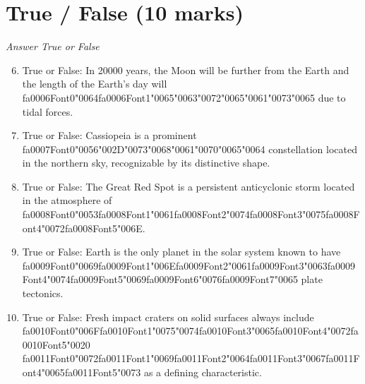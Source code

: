 \documentclass[12pt]{article}
\begin{document}
\section*{True / False (10 marks)}
\textit{Answer True or False}
\begin{enumerate}[label=\arabic*.]
\setcounter{enumi}{5}
\item True or False: In 20000 years, the Moon will be further from the Earth and the length of the Earth's day will {\csname fa0006Font0\endcsname\char"0064}{\csname fa0006Font1\endcsname\char"0065}{\char"0063}{\char"0072}{\char"0065}{\char"0061}{\char"0073}{\char"0065} due to tidal forces.
\item True or False: Cassiopeia is a prominent {\csname fa0007Font0\endcsname\char"0056}{\char"002D}{\char"0073}{\char"0068}{\char"0061}{\char"0070}{\char"0065}{\char"0064} constellation located in the northern sky, recognizable by its distinctive shape.
\item True or False: The Great Red Spot is a persistent anticyclonic storm located in the atmosphere of {\csname fa0008Font0\endcsname\char"0053}{\csname fa0008Font1\endcsname\char"0061}{\csname fa0008Font2\endcsname\char"0074}{\csname fa0008Font3\endcsname\char"0075}{\csname fa0008Font4\endcsname\char"0072}{\csname fa0008Font5\endcsname\char"006E}.
\item True or False: Earth is the only planet in the solar system known to have {\csname fa0009Font0\endcsname\char"0069}{\csname fa0009Font1\endcsname\char"006E}{\csname fa0009Font2\endcsname\char"0061}{\csname fa0009Font3\endcsname\char"0063}{\csname fa0009Font4\endcsname\char"0074}{\csname fa0009Font5\endcsname\char"0069}{\csname fa0009Font6\endcsname\char"0076}{\csname fa0009Font7\endcsname\char"0065} plate tectonics.
\item True or False: Fresh impact craters on solid surfaces always include {\csname fa0010Font0\endcsname\char"006F}{\csname fa0010Font1\endcsname\char"0075}{\char"0074}{\csname fa0010Font3\endcsname\char"0065}{\csname fa0010Font4\endcsname\char"0072}{\csname fa0010Font5\endcsname\char"0020} {\csname fa0011Font0\endcsname\char"0072}{\csname fa0011Font1\endcsname\char"0069}{\csname fa0011Font2\endcsname\char"0064}{\csname fa0011Font3\endcsname\char"0067}{\csname fa0011Font4\endcsname\char"0065}{\csname fa0011Font5\endcsname\char"0073} as a defining characteristic.
\end{enumerate}
\end{document}

